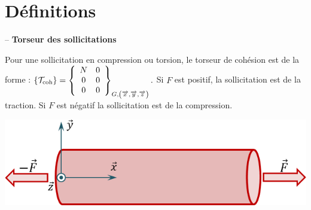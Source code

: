 \documentclass[10pt,fleqn]{article} %
\begin{document}

\vspace{2cm}
\pagestyle{fancy}
\thispagestyle{plain}

\section{Définitions}
\begin{defi} -- \textbf{Torseur des sollicitations}  ~\\

\begin{minipage}[c]{.65\linewidth}
Pour une sollicitation en compression ou torsion, le torseur de cohésion est de la forme : 
$
\{\mathcal{T}_{\text{coh}}\} = \left\{ \begin{array}{cc} {N} & {0}\\{0} & {0}\\{0} & {0}\\\end{array} \right\}_{G,\left(\overrightarrow{x_{}}, \overrightarrow{y_{}}, \overrightarrow{z_{}} \right)}.
$
Si $F$ est positif, la sollicitation est de la traction. Si $F$ est négatif la sollicitation est de la compression.
\end{minipage} \hfill
\begin{minipage}[c]{.3\linewidth}
\begin{center}
\includegraphics[width=\linewidth]{images/traction}
\end{center}
\end{minipage}



\end{defi}
\end{document}
